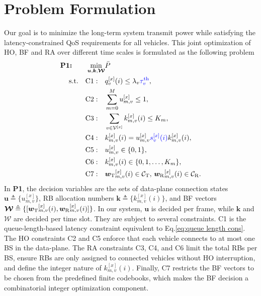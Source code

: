 \documentclass[conference, a4paper]{IEEEtran}
\newcommand{\rev}[1]{\textcolor{revisioncolor}{{}#1}}
\newif\ifshowdeletions
\newcommand{\currentdel}[1]{\ifshowdeletions\textcolor{deletioncolor}{\sout{#1}}\fi}
\theoremstyle{remark}
\begin{document}
\section{Problem Formulation}{\label{sec:Problem Formulation}}

Our goal is to minimize the long-term system transmit power while satisfying the latency-constrained QoS requirements for all vehicles. This joint optimization of HO, BF and RA over different time scales is formulated as the following problem 
\begin{equation}
    \label{prob1}
    \begin{aligned}
        \textbf{P1:} \qquad  \min_{\bm{u},\bm{k}, \bm{\mathcal{W}}} & \bar{P} \\
        \textup{s.t.} \quad 
        \textup{C1}: \quad & q_v^{[x]}(i) \leq \lambda_v \text{\currentdel{$\tau^{{\rm th}}$}}\rev{\tau_v^{\rm th}}, \\
        \textup{C2}: \quad & \sum_{m=0}^{M} u_{m,v}^{[x]} \leq 1, \\
        \textup{C3}: \quad & \sum_{v\in\mathcal{V}^{[x]}} k_{m,v}^{[x]}(i) \leq K_m, \\
        \textup{C4}: \quad & k_{m,v}^{[x]}(i) = u_{m,v}^{[x]}\rev{s_v^{[x]}(i)}k_{m,v}^{[x]}(i), \\
        \textup{C5}: \quad & u_{m,v}^{[x]} \in \{0,1\}, \\
        \textup{C6}: \quad & k_{m,v}^{[x]}(i) \in \{0,1,\dots,K_m\}, \\
        \textup{C7}: \quad & {\bm{w}_{\rm T}}_{m,v}^{[x]}(i) \in \mathcal{C}_{\rm T}, \, {\bm{w}_{\rm R}}_{m,v}^{[x]}(i) \in \mathcal{C}_{\rm R}.
    \end{aligned}
\end{equation}
In \textbf{P1}, the decision variables are the sets of data-plane connection states $\bm{u} \triangleq \{ u_{m,v}^{[x]} \}$, RB allocation numbers $\bm{k} \triangleq \{ k_{m,v}^{[x]}(i) \}$, and BF vectors $\bm{\mathcal{W}} \triangleq \{ [{\bm{w}_{\rm T}}_{m,v}^{[x]}(i), {\bm{w}_{\rm R}}_{m,v}^{[x]}(i)] \}$. 
In our system, $\bm{u}$ is decided per frame, while $\bm{k}$ and $\bm{\mathcal{W}}$ are decided per time slot.
They are subject to several constraints. 
{C1} is the queue-length-based latency constraint equivalent to Eq.\eqref{eq:queue length cons}. 
The HO constraints {C2} and {C5} enforce that each vehicle connects to at most one BS in the data-plane. 
The RA constraints {C3}, {C4}, and {C6} limit the total RBs per BS, ensure RBs are only assigned to connected vehicles\rev{ without HO interruption}, and define the integer nature of $k_{m,v}^{[x]}(i)$. 
Finally, {C7} restricts the BF vectors to be chosen from the predefined finite codebooks, which makes the BF decision a combinatorial integer optimization component.
\end{document}
